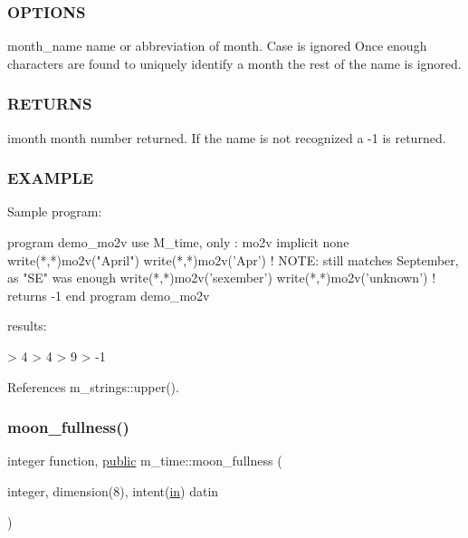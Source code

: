 \begin{DoxyVerb}
\subsubsection*{O\+P\+T\+I\+O\+NS}

month\+\_\+name name or abbreviation of month. Case is ignored Once enough characters are found to uniquely identify a month the rest of the name is ignored. \subsubsection*{R\+E\+T\+U\+R\+NS}

imonth month number returned. If the name is not recognized a -\/1 is returned.

\subsubsection*{E\+X\+A\+M\+P\+LE}

\begin{DoxyVerb}Sample program:

 program demo_mo2v
 use M_time, only : mo2v
 implicit none
    write(*,*)mo2v("April")
    write(*,*)mo2v('Apr')
    ! NOTE: still matches September, as "SE" was enough
    write(*,*)mo2v('sexember')
    write(*,*)mo2v('unknown')  ! returns -1
 end program demo_mo2v

results:

   >  4
   >  4
   >  9
   > -1 \end{DoxyVerb}
 

References m\+\_\+strings\+::upper().

\mbox{\label{namespacem__time_a702b39998a769b8f60070c0bec975ee2}} 
\subsubsection{\texorpdfstring{moon\+\_\+fullness()}{moon\_fullness()}}
{\footnotesize\ttfamily integer function, \hyperlink{M__stopwatch_83_8txt_a2f74811300c361e53b430611a7d1769f}{public} m\+\_\+time\+::moon\+\_\+fullness (\begin{DoxyParamCaption}\item[{integer, dimension(8), intent(\hyperlink{M__journal_83_8txt_afce72651d1eed785a2132bee863b2f38}{in})}]{datin }\end{DoxyParamCaption})}




\end{DoxyVerb}
